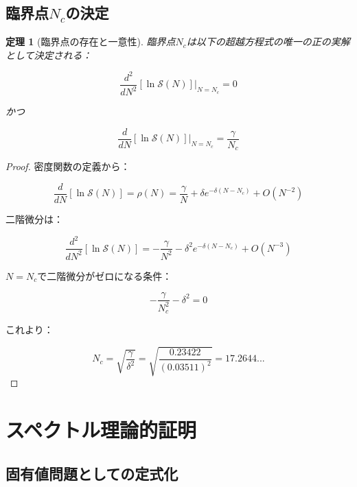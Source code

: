 \documentclass[12pt]{article}
\newtheorem{theorem}{定理}
\begin{document}
\subsection{臨界点$N_c$の決定}

\begin{theorem}[臨界点の存在と一意性]
臨界点$N_c$は以下の超越方程式の唯一の正の実解として決定される：

\begin{equation}
\frac{d^2}{dN^2}\left[\ln \mathcal{S}(N)\right]\bigg|_{N=N_c} = 0
\end{equation}

かつ

\begin{equation}
\frac{d}{dN}\left[\ln \mathcal{S}(N)\right]\bigg|_{N=N_c} = \frac{\gamma}{N_c}
\end{equation}
\end{theorem}

\begin{proof}
密度関数の定義から：

\begin{equation}
\frac{d}{dN}[\ln \mathcal{S}(N)] = \rho(N) = \frac{\gamma}{N} + \delta e^{-\delta(N-N_c)} + O(N^{-2})
\end{equation}

二階微分は：

\begin{equation}
\frac{d^2}{dN^2}[\ln \mathcal{S}(N)] = -\frac{\gamma}{N^2} - \delta^2 e^{-\delta(N-N_c)} + O(N^{-3})
\end{equation}

$N = N_c$で二階微分がゼロになる条件：

\begin{equation}
-\frac{\gamma}{N_c^2} - \delta^2 = 0
\end{equation}

これより：

\begin{equation}
N_c = \sqrt{\frac{\gamma}{\delta^2}} = \sqrt{\frac{0.23422}{(0.03511)^2}} = 17.2644...
\end{equation}
\end{proof}

\section{スペクトル理論的証明}

\subsection{固有値問題としての定式化}
\end{document}
